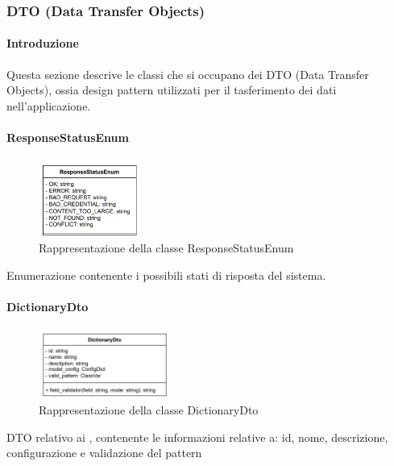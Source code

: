 \subsubsection{DTO (Data Transfer Objects)}

\paragraph{Introduzione}
\par Questa sezione descrive le classi che si occupano dei DTO (Data Transfer Objects), ossia design pattern utilizzati per il tasferimento dei dati nell'applicazione.

\paragraph{ResponseStatusEnum} \label{ResponseStatusEnum} 
\begin{figure}[h!]
    \centering
    \includegraphics[width=0.30\textwidth]{assets/Backend/response_status_enum.png}
    \caption{Rappresentazione della classe ResponseStatusEnum}
\end{figure}
\par Enumerazione contenente i possibili stati di risposta del sistema.

\paragraph{DictionaryDto} \label{DictionaryDto}
\begin{figure}[h!]
    \centering
    \includegraphics[width=0.40\textwidth]{assets/Backend/dictionary_dto.png}
    \caption{Rappresentazione della classe DictionaryDto}
\end{figure}
\par DTO relativo ai , contenente le informazioni relative a: id, nome, descrizione, configurazione e validazione del pattern

